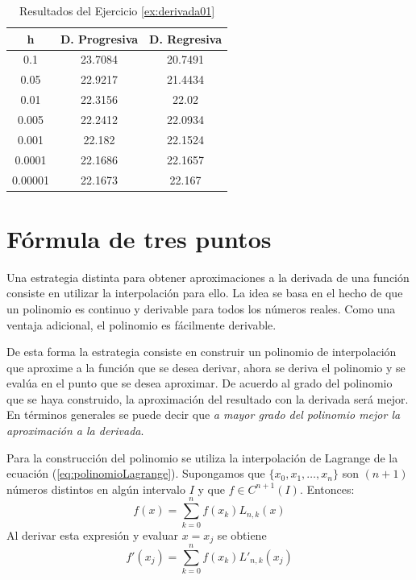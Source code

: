 \begin{exerciseT}
{\begin{table}[H]
	\centering
	\begin{tabular}{ccc}
		\toprule
		h & D. Progresiva & D. Regresiva \\
		\midrule
		0.1 & 23.7084 & 20.7491 \\
		0.05 & 22.9217 & 21.4434 \\
		0.01 & 22.3156 & 22.02 \\
		0.005 & 22.2412 & 22.0934 \\
		0.001 & 22.182 & 22.1524 \\
		0.0001 & 22.1686 & 22.1657 \\
		0.00001 & 22.1673 & 22.167\\
		\bottomrule
	\end{tabular}
	\label{table:derivada01}
	\caption{Resultados del Ejercicio \ref{ex:derivada01}}
\end{table}
\label{ex:derivada01}
}\end{exerciseT}

\section{Fórmula de tres puntos}
\label{section:d3p}
Una estrategia distinta para obtener aproximaciones a la derivada de una función consiste en utilizar la interpolación para ello.
La idea se basa en el hecho de que un polinomio es continuo y derivable para todos los números reales. Como una ventaja adicional, 
el polinomio es fácilmente derivable. 

De esta forma la estrategia consiste en construir un polinomio de interpolación que aproxime 
a la función que se desea derivar, ahora se deriva el polinomio y se evalúa en el punto que se desea aproximar. De acuerdo al grado
del polinomio que se haya construido, la aproximación del resultado con la derivada será mejor. En términos generales se puede decir
que \textit{a mayor grado del polinomio mejor la aproximación a la derivada}.

Para la construcción del polinomio se utiliza la interpolación de Lagrange de la ecuación (\ref{eq:polinomioLagrange}). Supongamos 
que $\{x_0,x_1,\dots,x_n\}$ son $(n+1)$ números distintos en algún intervalo $I$ y que $f\in C^{n+1}(I)$. Entonces:
\[ f(x) = \sum_{k=0}^n f(x_k)L_{n,k}(x) \]
Al derivar esta expresión y evaluar $x=x_j$ se obtiene
\begin{equation}
	f'(x_j) = \sum_{k=0}^n f(x_k)L'_{n,k}(x_j)
	\label{eq:formula(n+1)Puntos} 
\end{equation}

